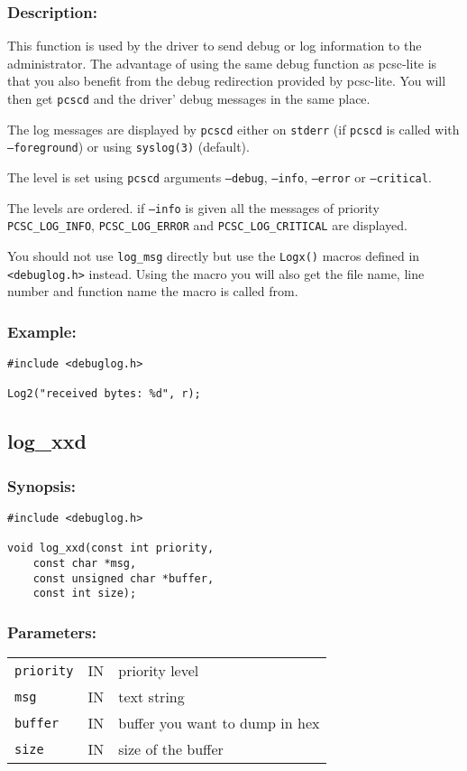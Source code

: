 \documentclass[a4paper,12pt]{article}
\newcommand{\synopsis}{\subsubsection{Synopsis:}}
\newcommand{\parameters}{\subsubsection{Parameters:}}
\newcommand{\desc}{\subsubsection{Description:}}
\newcommand{\example}{\subsubsection{Example:}}
\begin{document}
\desc

This function is used by the driver to send debug or log information to
the administrator. The advantage of using the same debug function as
pcsc-lite is that you also benefit from the debug redirection provided
by pcsc-lite. You will then get \texttt{pcscd} and the driver' debug
messages in the same place.

The log messages are displayed by \texttt{pcscd} either on
\texttt{stderr} (if \texttt{pcscd} is called with \texttt{--foreground})
or using \texttt{syslog(3)} (default).

The level is set using \texttt{pcscd} arguments \texttt{--debug},
\texttt{--info}, \texttt{--error} or \texttt{--critical}.

The levels are ordered. if \texttt{--info} is given all the messages of
priority \texttt{PCSC\_LOG\_INFO}, \texttt{PCSC\_LOG\_ERROR} and
\texttt{PCSC\_LOG\_CRITICAL} are displayed.

You should not use \texttt{log\_msg} directly but use the
\texttt{Logx()} macros defined in \texttt{<debuglog.h>} instead. Using the
macro you will also get the file name, line number and function name the
macro is called from.

\example
\begin{verbatim}
#include <debuglog.h>

Log2("received bytes: %d", r);
\end{verbatim}


\subsection{log\_xxd}

\synopsis
\begin{verbatim}
#include <debuglog.h>

void log_xxd(const int priority,
    const char *msg,
    const unsigned char *buffer,
    const int size);
\end{verbatim}

\parameters

\begin{tabular}{lll}
\texttt{priority} & IN & priority level \\
\texttt{msg} & IN & text string \\
\texttt{buffer} & IN & buffer you want to dump in hex \\
\texttt{size} & IN & size of the buffer \\
\end{tabular}
\end{document}

